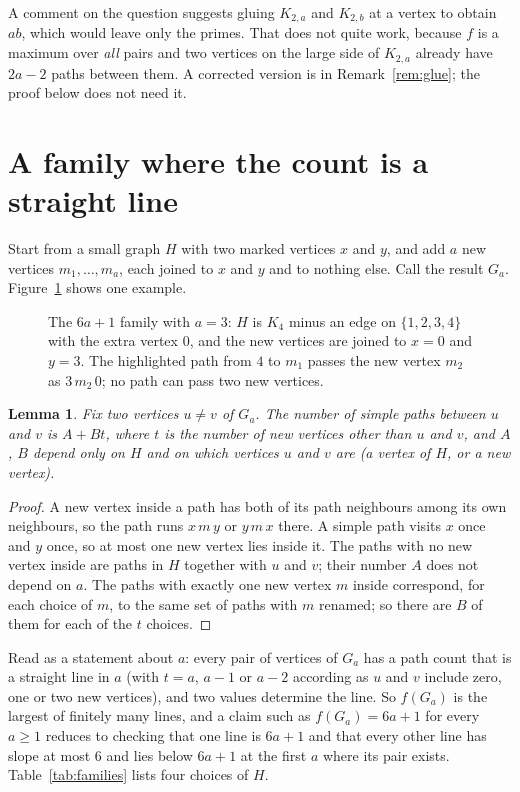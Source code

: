 \documentclass[11pt]{article}
\newtheorem{lemma}{Lemma}
\theoremstyle{remark}
\begin{document}
A comment on the question suggests gluing $K_{2,a}$ and $K_{2,b}$ at a vertex to obtain $ab$, which would leave
only the primes. That does not quite work, because $f$ is a maximum over \emph{all} pairs and two vertices on
the large side of $K_{2,a}$ already have $2a-2$ paths between them. A corrected version is in
Remark~\ref{rem:glue}; the proof below does not need it.

\section{A family where the count is a straight line}

Start from a small graph $H$ with two marked vertices $x$ and $y$, and add $a$ new vertices $m_1,\dots,m_a$, each
joined to $x$ and $y$ and to nothing else. Call the result $G_a$. Figure~\ref{fig:family} shows one example.

\begin{figure}[ht]
\centering

\caption{The $6a+1$ family with $a=3$: $H$ is $K_4$ minus an edge on $\{1,2,3,4\}$ with the extra vertex
$0$, and the new vertices are joined to $x=0$ and $y=3$. The highlighted path from $4$ to $m_1$ passes the new
vertex $m_2$ as $3\,m_2\,0$; no path can pass two new vertices.}
\label{fig:family}
\end{figure}

\begin{lemma}\label{lem:line}
Fix two vertices $u\ne v$ of $G_a$. The number of simple paths between $u$ and $v$ is $A+Bt$, where $t$ is the number of
new vertices other than $u$ and $v$, and $A$, $B$ depend only on $H$ and on which vertices $u$ and $v$ are
(a vertex of $H$, or a new vertex).
\end{lemma}

\begin{proof}
A new vertex inside a path has both of its path neighbours among its own neighbours, so the path runs
$x\,m\,y$ or $y\,m\,x$ there. A simple path visits $x$ once and $y$ once, so at most one new vertex lies inside
it. The paths with no new vertex inside are paths in $H$ together with $u$ and $v$; their number $A$ does not
depend on $a$. The paths with exactly one new vertex $m$ inside correspond, for each choice of $m$, to the same
set of paths with $m$ renamed; so there are $B$ of them for each of the $t$ choices.
\end{proof}

Read as a statement about $a$: every pair of vertices of $G_a$ has a path count that is a straight line in $a$
(with $t=a$, $a-1$ or $a-2$ according as $u$ and $v$ include zero, one or two new vertices), and two values
determine the line. So $f(G_a)$ is the largest of finitely many lines, and a claim such as $f(G_a)=6a+1$ for
every $a\ge1$ reduces to checking that one line is $6a+1$ and that every other line has slope at most $6$ and
lies below $6a+1$ at the first $a$ where its pair exists. Table~\ref{tab:families} lists four choices of $H$.
\end{document}
